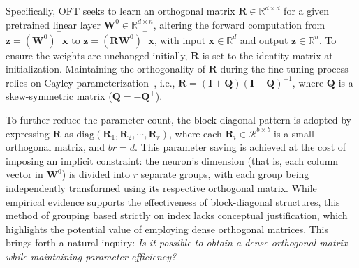 Specifically, OFT seeks to learn an orthogonal matrix $\bm{R}\in\mathbb{R}^{d\times d}$ for a given pretrained linear layer $\bm{W}^0\in\mathbb{R}^{d\times n}$, altering the forward computation from $\bm{z}=(\bm{W}^0)^\top\bm{x}$ to $\bm{z}=(\bm{R}\bm{W}^0)^\top\bm{x}$, with input $\bm{x}\in\mathbb{R}^{d}$ and output $\bm{z}\in\mathbb{R}^{n}$. To ensure the weights are unchanged initially, $\bm{R}$ is set to the identity matrix at initialization. Maintaining the orthogonality of $\bm{R}$ during the fine-tuning process relies on Cayley parameterization~\cite{qiu2023controlling,liu2021orthogonal}, i.e., $\bm{R}=(\bm{I}+\bm{Q})(\bm{I}-\bm{Q})^{-1}$, where $\bm{Q}$ is a skew-symmetric matrix ($\bm{Q}=-\bm{Q}^\top$). 

To further reduce the parameter count, the block-diagonal pattern is adopted by expressing $\bm{R}$ as $\text{diag}(\bm{R}_1,\bm{R}_2,\cdots,\bm{R}_r)$, where each $\bm{R}_i\in\mathcal{R}^{b\times b}$ is a small orthogonal matrix, and $br=d$. This parameter saving is achieved at the cost of imposing an implicit constraint: the neuron's dimension (that is, each column vector in $\bm{W}^0$) is divided into $r$ separate groups, with each group being independently transformed using its respective orthogonal matrix. While empirical evidence supports the effectiveness of block-diagonal structures, this method of grouping based strictly on index lacks conceptual justification, which highlights the potential value of employing dense orthogonal matrices. This brings forth a natural inquiry: \emph{Is it possible to obtain a dense orthogonal matrix while maintaining parameter efficiency?}

